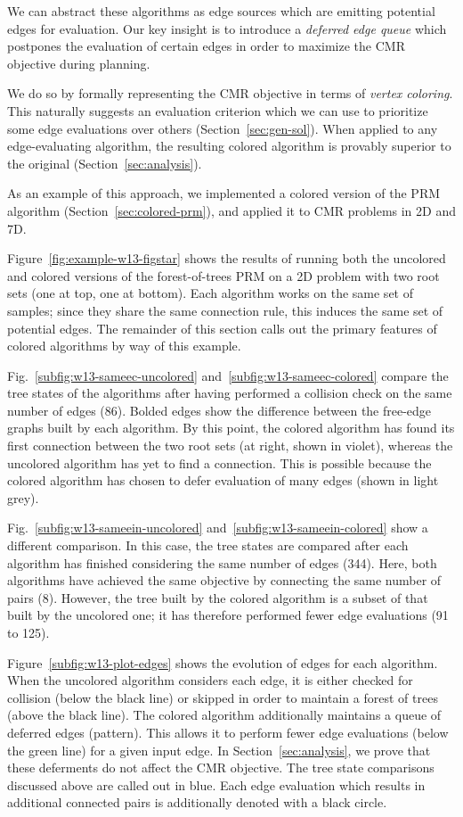 \documentclass{report}
\begin{document}
We can abstract these algorithms as edge sources which are emitting
potential edges for evaluation.
Our key insight is to introduce a \emph{deferred edge queue} 
which postpones the evaluation of certain edges in order to
maximize the CMR objective during planning.

We do so by formally representing the CMR objective
in terms of \emph{vertex coloring}.
This naturally suggests an evaluation criterion which we can use to
prioritize some edge evaluations over others (Section~\ref{sec:gen-sol}).
When applied to any edge-evaluating algorithm,
the resulting colored algorithm is provably superior to the original
(Section~\ref{sec:analysis}).

As an example of this approach,
we implemented a colored version of the PRM algorithm
(Section~\ref{sec:colored-prm}),
and applied it to CMR problems in 2D and 7D.

Figure~\ref{fig:example-w13-figstar} shows the results of running
both the uncolored and colored versions of the forest-of-trees PRM
on a 2D problem with two root sets (one at top, one at bottom).
Each algorithm works on the same set of samples;
since they share the same connection rule,
this induces the same set of potential edges.
The remainder of this section calls out the primary features of colored
algorithms by way of this example.

Fig.~\ref{subfig:w13-sameec-uncolored}
and~\ref{subfig:w13-sameec-colored}
compare the tree states of the algorithms
after having performed a collision check on the same number of edges (86).
Bolded edges show the difference between the free-edge
graphs built by each algorithm.
By this point, the colored algorithm has found its first connection between
the two root sets (at right, shown in violet),
whereas the uncolored algorithm has yet to find a connection.
This is possible because the colored algorithm has chosen to defer
evaluation of many edges (shown in light grey).

Fig.~\ref{subfig:w13-sameein-uncolored}
and~\ref{subfig:w13-sameein-colored}
show a different comparison.
In this case,
the tree states are compared after each algorithm has finished considering
the same number of edges (344).
Here, both algorithms have achieved the same objective by
connecting the same number of pairs (8).
However, the tree built by the colored algorithm is a subset of that
built by the uncolored one;
it has therefore performed fewer edge evaluations (91 to 125).

Figure~\ref{subfig:w13-plot-edges} shows the evolution of edges
for each algorithm.
When the uncolored algorithm considers each edge,
it is either checked for collision (below the black line)
or skipped in order to maintain a forest of trees (above the black line).
The colored algorithm additionally maintains a queue of deferred edges
(pattern).
This allows it to perform fewer edge evaluations (below the green line)
for a given input edge.
In Section~\ref{sec:analysis}, we prove that these deferments
do not affect the CMR objective.
The tree state comparisons discussed above are called out in blue.
Each edge evaluation which results in additional connected pairs is
additionally denoted with a black circle.
\end{document}
